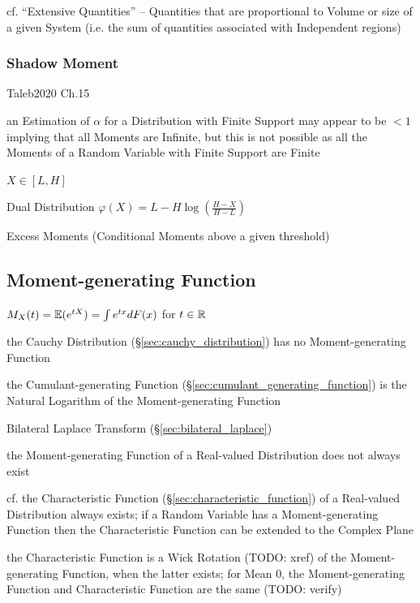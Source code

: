 cf. ``Extensive Quantities'' -- Quantities that are proportional to Volume or
size of a given System (i.e. the sum of quantities associated with Independent
regions)



\subsubsection{Shadow Moment}\label{sec:shadow_moment}

Taleb2020 Ch.15

an Estimation of $\alpha$ for a Distribution with Finite Support may appear to
be $< 1$ implying that all Moments are Infinite, but this is not possible as all
the Moments of a Random Variable with Finite Support are Finite

$X \in [L, H]$

Dual Distribution $\varphi(X) = L - H \log(\frac{H - X}{H - L})$

Excess Moments (Conditional Moments above a given threshold)



\subsection{Moment-generating Function}\label{sec:moment_generating_function}

$M_X(t) = \mathbb{E}(e^{tX}) = \int e^{tx} dF(x)$ for $t \in \mathbb{R}$

the Cauchy Distribution (\S\ref{sec:cauchy_distribution}) has no
Moment-generating Function

the Cumulant-generating Function (\S\ref{sec:cumulant_generating_function}) is
the Natural Logarithm of the Moment-generating Function

\fist Bilateral Laplace Transform (\S\ref{sec:bilateral_laplace})

the Moment-generating Function of a Real-valued Distribution does not always
exist

cf. the Characteristic Function (\S\ref{sec:characteristic_function}) of a
Real-valued Distribution always exists; if a Random Variable has a
Moment-generating Function then the Characteristic Function can be extended to
the Complex Plane

the Characteristic Function is a Wick Rotation (TODO: xref) of the
Moment-generating Function, when the latter exists; for Mean $0$, the
Moment-generating Function and Characteristic Function are the same (TODO:
verify)

